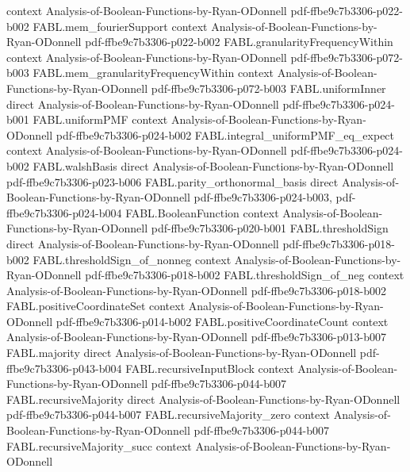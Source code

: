 \begin{theorem}
  {context}
  {Analysis-of-Boolean-Functions-by-Ryan-ODonnell}
  {pdf-ffbe9c7b3306-p022-b002}
\proofstep
  {FABL.mem_fourierSupport}
  {context}
  {Analysis-of-Boolean-Functions-by-Ryan-ODonnell}
  {pdf-ffbe9c7b3306-p022-b002}
\proofstep
  {FABL.granularityFrequencyWithin}
  {context}
  {Analysis-of-Boolean-Functions-by-Ryan-ODonnell}
  {pdf-ffbe9c7b3306-p072-b003}
\proofstep
  {FABL.mem_granularityFrequencyWithin}
  {context}
  {Analysis-of-Boolean-Functions-by-Ryan-ODonnell}
  {pdf-ffbe9c7b3306-p072-b003}
\proofstep
  {FABL.uniformInner}
  {direct}
  {Analysis-of-Boolean-Functions-by-Ryan-ODonnell}
  {pdf-ffbe9c7b3306-p024-b001}
\proofstep
  {FABL.uniformPMF}
  {context}
  {Analysis-of-Boolean-Functions-by-Ryan-ODonnell}
  {pdf-ffbe9c7b3306-p024-b002}
\proofstep
  {FABL.integral_uniformPMF_eq_expect}
  {context}
  {Analysis-of-Boolean-Functions-by-Ryan-ODonnell}
  {pdf-ffbe9c7b3306-p024-b002}
\proofstep
  {FABL.walshBasis}
  {direct}
  {Analysis-of-Boolean-Functions-by-Ryan-ODonnell}
  {pdf-ffbe9c7b3306-p023-b006}
\proofstep
  {FABL.parity_orthonormal_basis}
  {direct}
  {Analysis-of-Boolean-Functions-by-Ryan-ODonnell}
  {pdf-ffbe9c7b3306-p024-b003,
    pdf-ffbe9c7b3306-p024-b004}
\proofstep
  {FABL.BooleanFunction}
  {context}
  {Analysis-of-Boolean-Functions-by-Ryan-ODonnell}
  {pdf-ffbe9c7b3306-p020-b001}
\proofstep
  {FABL.thresholdSign}
  {direct}
  {Analysis-of-Boolean-Functions-by-Ryan-ODonnell}
  {pdf-ffbe9c7b3306-p018-b002}
\proofstep
  {FABL.thresholdSign_of_nonneg}
  {context}
  {Analysis-of-Boolean-Functions-by-Ryan-ODonnell}
  {pdf-ffbe9c7b3306-p018-b002}
\proofstep
  {FABL.thresholdSign_of_neg}
  {context}
  {Analysis-of-Boolean-Functions-by-Ryan-ODonnell}
  {pdf-ffbe9c7b3306-p018-b002}
\proofstep
  {FABL.positiveCoordinateSet}
  {context}
  {Analysis-of-Boolean-Functions-by-Ryan-ODonnell}
  {pdf-ffbe9c7b3306-p014-b002}
\proofstep
  {FABL.positiveCoordinateCount}
  {context}
  {Analysis-of-Boolean-Functions-by-Ryan-ODonnell}
  {pdf-ffbe9c7b3306-p013-b007}
\proofstep
  {FABL.majority}
  {direct}
  {Analysis-of-Boolean-Functions-by-Ryan-ODonnell}
  {pdf-ffbe9c7b3306-p043-b004}
\proofstep
  {FABL.recursiveInputBlock}
  {context}
  {Analysis-of-Boolean-Functions-by-Ryan-ODonnell}
  {pdf-ffbe9c7b3306-p044-b007}
\proofstep
  {FABL.recursiveMajority}
  {direct}
  {Analysis-of-Boolean-Functions-by-Ryan-ODonnell}
  {pdf-ffbe9c7b3306-p044-b007}
\proofstep
  {FABL.recursiveMajority_zero}
  {context}
  {Analysis-of-Boolean-Functions-by-Ryan-ODonnell}
  {pdf-ffbe9c7b3306-p044-b007}
\proofstep
  {FABL.recursiveMajority_succ}
  {context}
  {Analysis-of-Boolean-Functions-by-Ryan-ODonnell}

\end{theorem}
